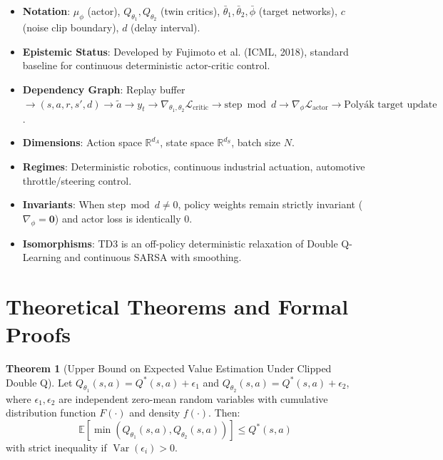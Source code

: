 \documentclass[11pt,a4paper]{article}
\theoremstyle{definition}
\newtheorem{theorem}{\textbf{Theorem}}[section]
\begin{document}
\begin{itemize}
    \item \textbf{Notation}: $\mu_\phi$ (actor), $Q_{\theta_1}, Q_{\theta_2}$ (twin critics), $\bar{\theta}_1, \bar{\theta}_2, \bar{\phi}$ (target networks), $c$ (noise clip boundary), $d$ (delay interval).
    \item \textbf{Epistemic Status}: Developed by Fujimoto et al. (ICML, 2018), standard baseline for continuous deterministic actor-critic control.
    \item \textbf{Dependency Graph}: Replay buffer $\to (s, a, r, s', d) \to \tilde{a} \to y_t \to \nabla_{\theta_1, \theta_2} \mathcal{L}_{\text{critic}} \to \text{step} \bmod d \to \nabla_\phi \mathcal{L}_{\text{actor}} \to \text{Polyák target update}$.
    \item \textbf{Dimensions}: Action space $\mathbb{R}^{d_A}$, state space $\mathbb{R}^{d_S}$, batch size $N$.
    \item \textbf{Regimes}: Deterministic robotics, continuous industrial actuation, automotive throttle/steering control.
    \item \textbf{Invariants}: When $\text{step} \bmod d \ne 0$, policy weights remain strictly invariant ($\nabla_\phi = \mathbf{0}$) and actor loss is identically $0$.
    \item \textbf{Isomorphisms}: TD3 is an off-policy deterministic relaxation of Double Q-Learning and continuous SARSA with smoothing.
\end{itemize}

\section{Theoretical Theorems and Formal Proofs}

\begin{theorem}[Upper Bound on Expected Value Estimation Under Clipped Double Q]
Let $Q_{\theta_1}(s, a) = Q^*(s, a) + \epsilon_1$ and $Q_{\theta_2}(s, a) = Q^*(s, a) + \epsilon_2$, where $\epsilon_1, \epsilon_2$ are independent zero-mean random variables with cumulative distribution function $F(\cdot)$ and density $f(\cdot)$. Then:
{\boldmath
\begin{equation}
\mathbb{E}\left[ \min(Q_{\theta_1}(s, a), Q_{\theta_2}(s, a)) \right] \le Q^*(s, a)
\end{equation}
}
with strict inequality if $\operatorname{Var}(\epsilon_i) > 0$.
\end{theorem}
\end{document}
